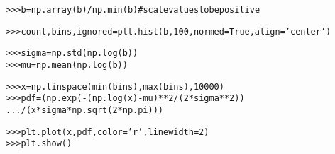 \begin{boxedminipage}{\funcwidth}
\begin{alltt}
{\textgreater}{\textgreater}{\textgreater} b = np.array(b) / np.min(b) \# scale values to be positive

{\textgreater}{\textgreater}{\textgreater} count, bins, ignored = plt.hist(b, 100, normed=True, align='center')

{\textgreater}{\textgreater}{\textgreater} sigma = np.std(np.log(b))
{\textgreater}{\textgreater}{\textgreater} mu = np.mean(np.log(b))

{\textgreater}{\textgreater}{\textgreater} x = np.linspace(min(bins), max(bins), 10000)
{\textgreater}{\textgreater}{\textgreater} pdf = (np.exp(-(np.log(x) - mu)**2 / (2 * sigma**2))
...        / (x * sigma * np.sqrt(2 * np.pi)))

{\textgreater}{\textgreater}{\textgreater} plt.plot(x, pdf, color='r', linewidth=2)
{\textgreater}{\textgreater}{\textgreater} plt.show()
\end{alltt}

\setlength{\parskip}{1ex}
    \end{boxedminipage}

    \label{trunk:qstkutil:bollinger:logseries}

    \vspace{0.5ex}

